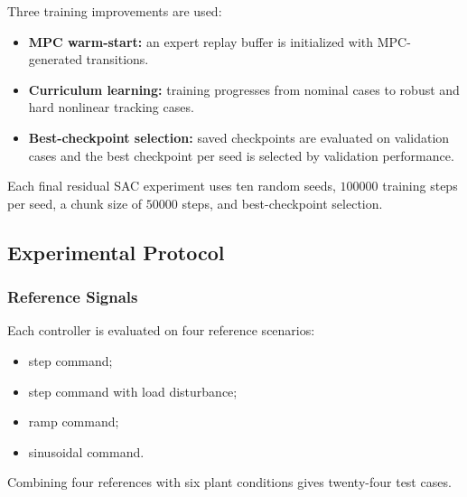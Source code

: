 \documentclass[conference]{IEEEtran}
\begin{document}
Three training improvements are used:
\begin{itemize}
    \item \textbf{MPC warm-start:} an expert replay buffer is initialized with MPC-generated transitions.
    \item \textbf{Curriculum learning:} training progresses from nominal cases to robust and hard nonlinear tracking cases.
    \item \textbf{Best-checkpoint selection:} saved checkpoints are evaluated on validation cases and the best checkpoint per seed is selected by validation performance.
\end{itemize}

Each final residual SAC experiment uses ten random seeds, $100000$ training steps per seed, a chunk size of $50000$ steps, and best-checkpoint selection.

\subsection{Experimental Protocol}
\subsubsection{Reference Signals}
Each controller is evaluated on four reference scenarios:
\begin{itemize}
    \item step command;
    \item step command with load disturbance;
    \item ramp command;
    \item sinusoidal command.
\end{itemize}
Combining four references with six plant conditions gives twenty-four test cases.
\end{document}
